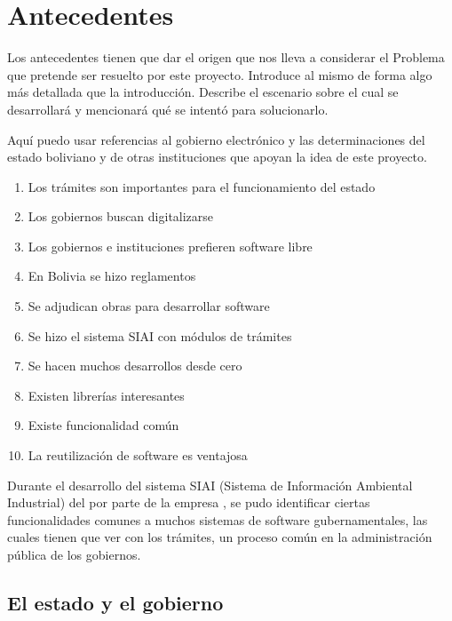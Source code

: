 \section{Antecedentes}

\begin{tcolorbox}[breakable]

    Los antecedentes tienen que dar el origen que nos lleva a considerar el Problema
    que pretende ser resuelto por este proyecto. Introduce al mismo de forma
    algo más detallada que la introducción.
    Describe el escenario sobre el cual se desarrollará y mencionará qué se intentó para solucionarlo.

    Aquí puedo usar referencias al gobierno electrónico y las determinaciones
    del estado boliviano y de otras instituciones que apoyan la idea de este
    proyecto.

    \begin{enumerate}
        \item Los trámites son importantes para el funcionamiento del estado
        \item Los gobiernos buscan digitalizarse
        \item Los gobiernos e instituciones prefieren software libre
        \item En Bolivia se hizo reglamentos
        \item Se adjudican obras para desarrollar software
        \item Se hizo el sistema SIAI con módulos de trámites
        \item Se hacen muchos desarrollos desde cero
        \item Existen librerías interesantes
        \item Existe funcionalidad común
        \item La reutilización de software es ventajosa
    \end{enumerate}

\end{tcolorbox}

Durante el desarrollo del sistema SIAI (Sistema de Información Ambiental
Industrial) del  por parte
de la empresa , se pudo identificar ciertas funcionalidades comunes a muchos
sistemas de software gubernamentales, las cuales tienen que ver con los trámites, un proceso común en la administración pública de los gobiernos.

\subsection{El estado y el gobierno}

